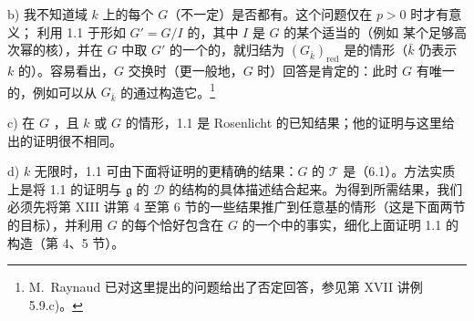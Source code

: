 b) 我不知道域 $k$ 上的每个 $G$（不一定）是否都有。这个问题仅在 $p>0$ 时才有意义；
利用 1.1 于形如 $G'=G/I$ 的，其中 $I$ 是 $G$ 的某个适当的（例如 某个足够高次幂的核），并在 $G$ 中取 $G'$ 的一个的，就归结为 $(G_{\bar k})_{\mathrm{red}}$ 是的情形（$\bar k$ 仍表示 $k$ 的）。容易看出，$G$ 交换时（更一般地，$G$ 时）回答是肯定的：此时 $G$ 有唯一的，例如可以从 $G_{\bar k}$ 的通过构造它。\footnote{M.~Raynaud 已对这里提出的问题给出了否定回答，参见第 XVII 讲例 5.9.c)。}

c) 在 $G$ ，且 $k$ 或 $G$ 的情形，1.1 是 Rosenlicht 的已知结果；他的证明与这里给出的证明很不相同。

d) $k$ 无限时，1.1 可由下面将证明的更精确的结果：$G$ 的 $\mathcal T$ 是（6.1）。方法实质上是将 1.1 的证明与 $\mathfrak g$ 的 $\mathcal D$ 的结构的具体描述结合起来。为得到所需结果，我们必须先将第 XIII 讲第 4 至第 6 节的一些结果推广到任意基的情形（这是下面两节的目标），并利用 $G$ 的每个恰好包含在 $G$ 的一个中的事实，细化上面证明 1.1 的构造（第 4、5 节）。

